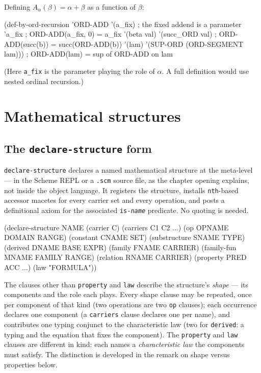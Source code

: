 Defining $A_\alpha(\beta) = \alpha + \beta$ as a function of $\beta$:
\begin{VNBcode}
(def-by-ord-recursion 'ORD-ADD '(a_fix)     ; the fixed addend is a parameter
  'a_fix                                    ; ORD-ADD(a_fix, 0) = a_fix
  '(beta val) '(succ_ORD val)              ; ORD-ADD(succ(b)) = succ(ORD-ADD(b))
  '(lam) '(SUP-ORD (ORD-SEGMENT lam)))     ; ORD-ADD(lam) = sup of ORD-ADD on lam
\end{VNBcode}

(Here \texttt{a\_fix} is the parameter playing the role of $\alpha$.
A full definition would use nested ordinal recursion.)

\section{Mathematical structures}
\label{sec:declare-structure}

\subsection{The \texttt{declare-structure} form}

\texttt{declare-structure} declares a named mathematical structure at the
meta-level --- in the Scheme REPL or a \texttt{.scm} source file, as the
chapter opening explains, not inside the object language.  It registers
the structure, installs \texttt{nth}-based accessor
macetes for every carrier set and every operation, and posts a
definitional axiom for the associated \texttt{is-\textit{name}} predicate.
No quoting is needed.

\begin{VNBcode}
(declare-structure NAME
  (carrier C)
  (carriers C1 C2 ...)
  (op OPNAME DOMAIN RANGE)
  (constant CNAME SET)
  (substructure SNAME TYPE)
  (derived DNAME BASE EXPR)
  (family FNAME CARRIER)
  (family-fun MNAME FAMILY RANGE)
  (relation RNAME CARRIER)
  (property PRED ACC ...)
  (law "FORMULA"))
\end{VNBcode}

The clauses other than \texttt{property} and \texttt{law} describe the
structure's \emph{shape} --- its components and the role each plays.  Every
shape clause may be repeated, once per component of that kind (two operations
are two \texttt{op} clauses); each occurrence declares one component (a
\texttt{carriers} clause declares one per name), and contributes one typing conjunct to the
characteristic law (two for \texttt{derived}: a typing and the equation that
fixes the component).  The \texttt{property} and \texttt{law} clauses are
different in kind: each names a \emph{characteristic law} the components must
satisfy.  The distinction is developed in the remark on shape versus properties
below.

